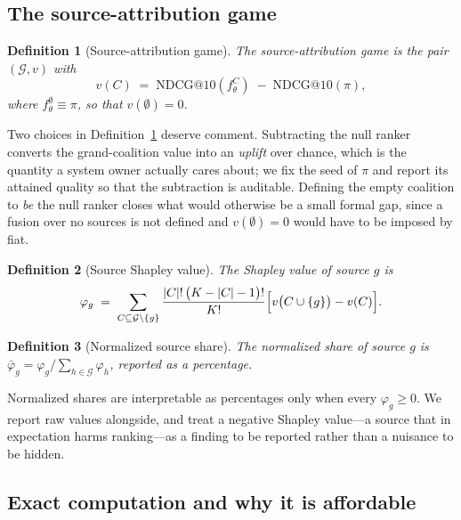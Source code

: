 \documentclass[pdflatex,sn-mathphys-num]{sn-jnl}%
\makeatletter
\theoremstyle{thmstyleone}%
\theoremstyle{thmstyletwo}%
\theoremstyle{thmstylethree}%
\newtheorem{definition}{Definition}%
\newcommand{\NDCG}{\mathrm{NDCG@10}}
\newcommand{\Gset}{\mathcal{G}}
\makeatother
\begin{document}
\subsection{The source-attribution game}\label{subsec3_4}

\begin{definition}[Source-attribution game]\label{def1}
The source-attribution game is the pair $(\Gset,v)$ with
\begin{equation}\label{eq1}
v(C) \;=\; \NDCG\!\left(f_\theta^{C}\right) \;-\; \NDCG(\pi),
\end{equation}
where $f_\theta^{\emptyset}\equiv\pi$, so that $v(\emptyset)=0$.
\end{definition}

Two choices in Definition~\ref{def1} deserve comment. Subtracting the null ranker converts the grand-coalition value into an \emph{uplift} over chance, which is the quantity a system owner actually cares about; we fix the seed of $\pi$ and report its attained quality so that the subtraction is auditable. Defining the empty coalition to \emph{be} the null ranker closes what would otherwise be a small formal gap, since a fusion over no sources is not defined and $v(\emptyset)=0$ would have to be imposed by fiat.

\begin{definition}[Source Shapley value]\label{def2}
The Shapley value of source $g$ is
\begin{equation}\label{eq2}
\varphi_g \;=\; \sum_{C\subseteq\Gset\setminus\{g\}}
\frac{|C|!\,\bigl(K-|C|-1\bigr)!}{K!}\Bigl[v\bigl(C\cup\{g\}\bigr)-v(C)\Bigr].
\end{equation}
\end{definition}

\begin{definition}[Normalized source share]\label{def3}
The normalized share of source $g$ is $\bar\varphi_g=\varphi_g/\sum_{h\in\Gset}\varphi_h$, reported as a percentage.
\end{definition}

Normalized shares are interpretable as percentages only when every $\varphi_g\ge 0$. We report raw values alongside, and treat a negative Shapley value---a source that in expectation harms ranking---as a finding to be reported rather than a nuisance to be hidden.

\subsection{Exact computation and why it is affordable}\label{subsec3_5}
\end{document}
